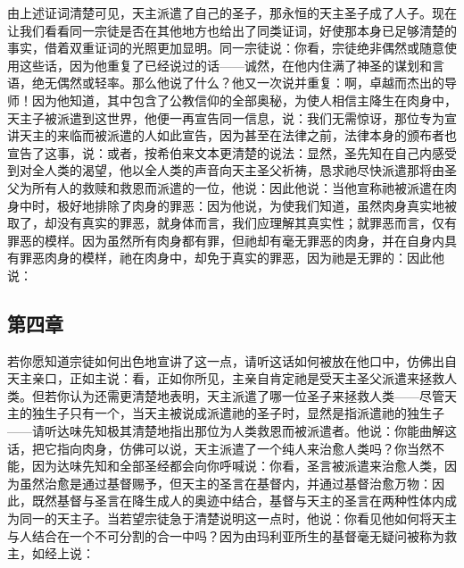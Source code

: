 由上述证词清楚可见，天主派遣了自己的圣子，那永恒的天主圣子成了人子。现在让我们看看同一宗徒是否在其他地方也给出了同类证词，好使那本身已足够清楚的事实，借着双重证词的光照更加显明。同一宗徒说：你看，宗徒绝非偶然或随意使用这些话，因为他重复了已经说过的话——诚然，在他内住满了神圣的谋划和言语，绝无偶然或轻率。那么他说了什么？他又一次说并重复：啊，卓越而杰出的导师！因为他知道，其中包含了公教信仰的全部奥秘，为使人相信主降生在肉身中，天主子被派遣到这世界，他便一再宣告同一信息，说：我们无需惊讶，那位专为宣讲天主的来临而被派遣的人如此宣告，因为甚至在法律之前，法律本身的颁布者也宣告了这事，说：或者，按希伯来文本更清楚的说法：显然，圣先知在自己内感受到对全人类的渴望，他以全人类的声音向天主圣父祈祷，恳求祂尽快派遣那将由圣父为所有人的救赎和救恩而派遣的一位，他说：因此他说：当他宣称祂被派遣在肉身中时，极好地排除了肉身的罪恶：因为他说，为使我们知道，虽然肉身真实地被取了，却没有真实的罪恶，就身体而言，我们应理解其真实性；就罪恶而言，仅有罪恶的模样。因为虽然所有肉身都有罪，但祂却有毫无罪恶的肉身，并在自身内具有罪恶肉身的模样，祂在肉身中，却免于真实的罪恶，因为祂是无罪的：因此他说：\par


\subsection{第四章}

\par

若你愿知道宗徒如何出色地宣讲了这一点，请听这话如何被放在他口中，仿佛出自天主亲口，正如主说：看，正如你所见，主亲自肯定祂是受天主圣父派遣来拯救人类。但若你认为还需更清楚地表明，天主派遣了哪一位圣子来拯救人类——尽管天主的独生子只有一个，当天主被说成派遣祂的圣子时，显然是指派遣祂的独生子——请听达味先知极其清楚地指出那位为人类救恩而被派遣者。他说：你能曲解这话，把它指向肉身，仿佛可以说，天主派遣了一个纯人来治愈人类吗？你当然不能，因为达味先知和全部圣经都会向你呼喊说：你看，圣言被派遣来治愈人类，因为虽然治愈是通过基督赐予，但天主的圣言在基督内，并通过基督治愈万物：因此，既然基督与圣言在降生成人的奥迹中结合，基督与天主的圣言在两种性体内成为同一的天主子。当若望宗徒急于清楚说明这一点时，他说：你看见他如何将天主与人结合在一个不可分割的合一中吗？因为由玛利亚所生的基督毫无疑问被称为救主，如经上说：\par

